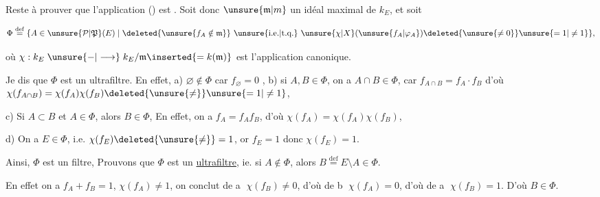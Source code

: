 

 Reste à prouver que l'application () est . Soit donc $\unsure{\mathfrak m|m}$ un idéal maximal de $k_E$, et soit

\[
\Phi\overset{\mathrm{def}}{=}\{A\in\unsure{\mathcal P|\mathfrak P}(E)\mid \deleted{\unsure{f_A\notin\mathfrak m}}\ \text{\unsure{i.e.|t.q.} }\unsure{\chi|X}(\unsure{f_A|\varphi_A})\deleted{\unsure{\ne0}}\unsure{=1|\ne1}\},
\]

où $\chi:k_E\mathrel{\unsure{-|\longrightarrow}} k_E/\mathfrak m\inserted{=k(\mathfrak m)}$ est l'application canonique.

Je dis que $\Phi$ est un ultrafiltre. En effet, a) $\varnothing\notin\Phi$ car $f_\varnothing=0$ , b) si $A,B\in\Phi$, on a  $A\cap B\in\Phi$, car $f_{A\cap B}=f_A\cdot f_B$ d'où $\chi(f_{A\cap B})=\chi(f_A)\chi(f_B)\deleted{\unsure{\ne}}\unsure{=1|\ne1}$,

c) Si $A\subset B$ et $A\in\Phi$, alors $B\in\Phi$,    En effet, on a $f_A=f_A f_B$, d'où $\chi(f_A)=\chi(f_A)\chi(f_B)$, 

 d) On a $E\in\Phi$, i.e. $\chi(f_E)\deleted{\unsure{\ne}}=1$, or $f_E=1$ donc $\chi(f_E)=1$. 

Ainsi, $\Phi$ est un filtre,       Prouvons que   $\Phi$ est un \uline{ultrafiltre}, ie.  si $A\notin\Phi$, alors $B\overset{\mathrm{def}}{=}E\setminus A\in\Phi$.

En effet on a  $f_A+f_B=1$,     $\chi(f_A)\ne1$, on conclut de \textcircled{a} $\chi(f_B)\ne0$, d'où de \textcircled{b} $\chi(f_A)=0$, d'où de \textcircled{a} $\chi(f_B)=1$. D'où $B\in\Phi$.

